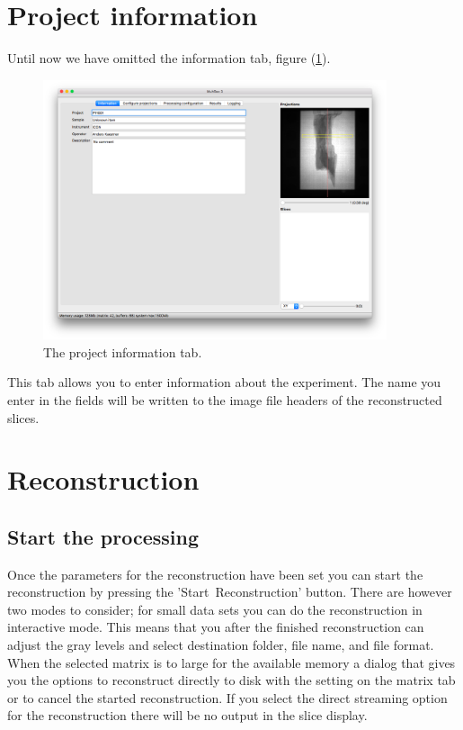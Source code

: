 \documentclass[a4paper]{scrreprt}
\begin{document}
\section{Project information}
Until now we have omitted the information tab, figure
(\ref{fig_projectinfotab}).
\begin{figure}[ht!]
\centering
\includegraphics[width=0.9\textwidth]{figures3/Main_Information.png}
\caption{The project information tab.}\label{fig_projectinfotab}
\end{figure}
This tab allows you to enter information about the experiment. The name you enter in the fields will be written to the image file headers of the reconstructed slices.

\section{Reconstruction}

\subsection{Start the processing}
Once the parameters for the reconstruction have been set you can start the reconstruction by pressing the 'Start~Reconstruction' button. There are however
two modes to consider; for small data sets you can do the reconstruction in interactive mode. This means that you after the finished reconstruction can adjust the gray levels and select destination folder, file name, and file format. When the selected matrix is to large for the available memory a dialog that gives you the options to reconstruct directly to disk with the setting on the matrix tab or to cancel the started reconstruction. If you select the direct streaming option for the reconstruction there will be no output in the slice display.
\end{document}
